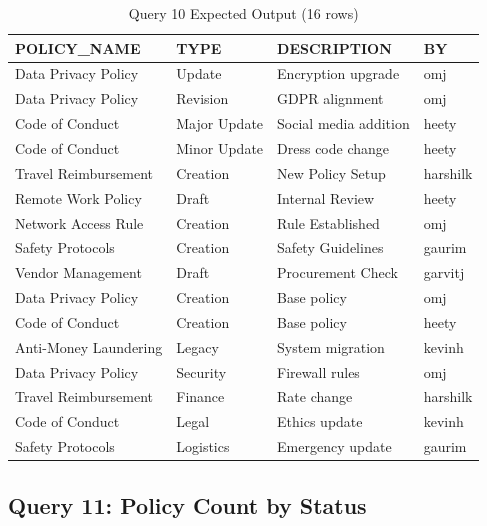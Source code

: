 \documentclass[conference]{IEEEtran}
\begin{document}
\begin{table}[H]
\centering
\caption{Query 10 Expected Output (16 rows)}
\begin{tabular}{|l|l|l|l|}
\hline
\textbf{POLICY\_NAME} & \textbf{TYPE} & \textbf{DESCRIPTION} & \textbf{BY} \\
\hline
Data Privacy Policy   & Update       & Encryption upgrade    & omj      \\
Data Privacy Policy   & Revision     & GDPR alignment        & omj      \\
Code of Conduct       & Major Update & Social media addition & heety    \\
Code of Conduct       & Minor Update & Dress code change     & heety    \\
Travel Reimbursement  & Creation     & New Policy Setup      & harshilk \\
Remote Work Policy    & Draft        & Internal Review       & heety    \\
Network Access Rule   & Creation     & Rule Established      & omj      \\
Safety Protocols      & Creation     & Safety Guidelines     & gaurim   \\
Vendor Management     & Draft        & Procurement Check     & garvitj  \\
Data Privacy Policy   & Creation     & Base policy           & omj      \\
Code of Conduct       & Creation     & Base policy           & heety    \\
Anti-Money Laundering & Legacy       & System migration      & kevinh   \\
Data Privacy Policy   & Security     & Firewall rules        & omj      \\
Travel Reimbursement  & Finance      & Rate change           & harshilk \\
Code of Conduct       & Legal        & Ethics update         & kevinh   \\
Safety Protocols      & Logistics    & Emergency update      & gaurim   \\
\hline
\end{tabular}
\end{table}

\subsection{Query 11: Policy Count by Status}
\end{document}
